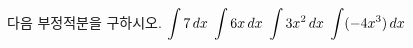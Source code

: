 다음 부정적분을 구하시오.
 $\displaystyle\int 7\mkern3mu dx$
 $\displaystyle\int 6x\mkern3mu dx$
 $\displaystyle\int 3x^2\mkern3mu dx$
 $\displaystyle\int (-4x^3)\mkern3mu dx$
